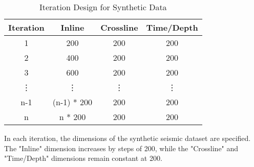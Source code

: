 \begin{table}[htbp]
    \centering
    \begin{threeparttable}
        \caption{Iteration Design for Synthetic Data}
        \label{table:iteration-design}
        \begin{tabular}{|c|c|c|c|}
            \hline
            \textbf{Iteration} & \textbf{Inline} & \textbf{Crossline} & \textbf{Time/Depth} \\
            \hline
            1                  & 200             & 200                & 200                 \\
            \hline
            2                  & 400             & 200                & 200                 \\
            \hline
            3                  & 600             & 200                & 200                 \\
            \hline
            \vdots             & \vdots          & \vdots             & \vdots              \\
            \hline
            n-1                & (n-1) * 200     & 200                & 200                 \\
            \hline
            n                  & n * 200         & 200                & 200                 \\
            \hline
        \end{tabular}
        \begin{tablenotes}
            \small
            \item In each iteration, the dimensions of the synthetic seismic dataset are specified.
            The "Inline" dimension increases by steps of 200, while the "Crossline" and "Time/Depth" dimensions remain constant at 200.
        \end{tablenotes}
    \end{threeparttable}
\end{table}